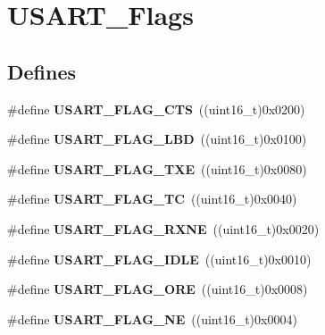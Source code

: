 \hypertarget{group__USART__Flags}{
\section{USART\_\-Flags}
\label{group__USART__Flags}
}
\subsection*{Defines}
\begin{DoxyCompactItemize}
\item 
\hypertarget{group__USART__Flags_ga94b7272319cca88a65075d5cb6048441}{
\#define {\bfseries USART\_\-FLAG\_\-CTS}~((uint16\_\-t)0x0200)}
\label{group__USART__Flags_ga94b7272319cca88a65075d5cb6048441}

\item 
\hypertarget{group__USART__Flags_ga27be6517de20ce14711f71dcd5a7b91f}{
\#define {\bfseries USART\_\-FLAG\_\-LBD}~((uint16\_\-t)0x0100)}
\label{group__USART__Flags_ga27be6517de20ce14711f71dcd5a7b91f}

\item 
\hypertarget{group__USART__Flags_ga7129f13333f2a7218838cc32fe507bfa}{
\#define {\bfseries USART\_\-FLAG\_\-TXE}~((uint16\_\-t)0x0080)}
\label{group__USART__Flags_ga7129f13333f2a7218838cc32fe507bfa}

\item 
\hypertarget{group__USART__Flags_gae7b85c9e2cc86af5bbc8b8d8b854410f}{
\#define {\bfseries USART\_\-FLAG\_\-TC}~((uint16\_\-t)0x0040)}
\label{group__USART__Flags_gae7b85c9e2cc86af5bbc8b8d8b854410f}

\item 
\hypertarget{group__USART__Flags_ga11d6b70c8f00216b6d8a43790dfdcf2f}{
\#define {\bfseries USART\_\-FLAG\_\-RXNE}~((uint16\_\-t)0x0020)}
\label{group__USART__Flags_ga11d6b70c8f00216b6d8a43790dfdcf2f}

\item 
\hypertarget{group__USART__Flags_gac2f1ccc91a834f9cbec3f058872b972a}{
\#define {\bfseries USART\_\-FLAG\_\-IDLE}~((uint16\_\-t)0x0010)}
\label{group__USART__Flags_gac2f1ccc91a834f9cbec3f058872b972a}

\item 
\hypertarget{group__USART__Flags_gabdb285b5c1876d93f9c802f9304538d5}{
\#define {\bfseries USART\_\-FLAG\_\-ORE}~((uint16\_\-t)0x0008)}
\label{group__USART__Flags_gabdb285b5c1876d93f9c802f9304538d5}

\item 
\hypertarget{group__USART__Flags_ga81781d27ffc8b85dfaf7b7b791229547}{
\#define {\bfseries USART\_\-FLAG\_\-NE}~((uint16\_\-t)0x0004)}
\label{group__USART__Flags_ga81781d27ffc8b85dfaf7b7b791229547}


\end{DoxyCompactItemize}
